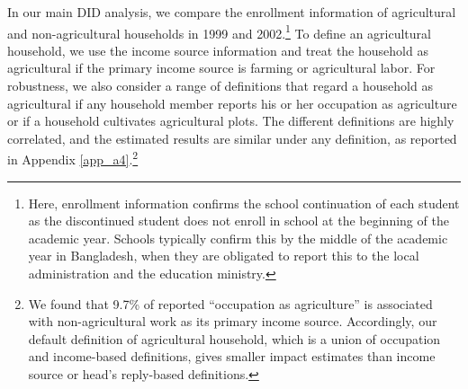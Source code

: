 \documentclass[12pt,letterpaper]{article}
\newcommand{\0}{\ensuremath{\mbox{\boldmath $0$}}}
\begin{document}
In our main DID analysis, we compare the enrollment information of agricultural and non-agricultural households in 1999 and 2002.\footnote{Here, enrollment information confirms the school continuation of each student as the discontinued student does not enroll in school at the beginning of the academic year. Schools typically confirm this by the middle of the academic year in Bangladesh, when they are obligated to report this to the local administration and the education ministry. } To define an agricultural household, we use the income source information and treat the household as agricultural if the primary income source is farming or agricultural labor. For robustness, we also consider a range of definitions that regard a household as agricultural if any household member reports his or her occupation as agriculture or if a household cultivates agricultural plots. The different definitions are highly correlated, and the estimated results are similar under any definition, as reported in Appendix \ref{app_a4}.\footnote{We found that 9.7\% of reported ``occupation as agriculture'' is associated with non-agricultural work as its primary income source. Accordingly, our default definition of agricultural household, which is a union of occupation and income-based definitions, gives smaller impact estimates than income source or head's reply-based definitions. }
\end{document}
